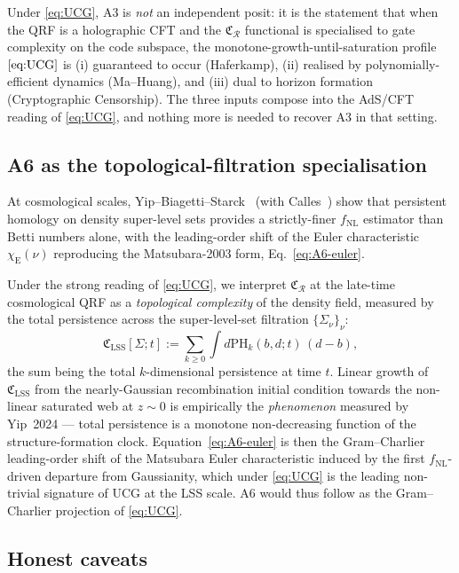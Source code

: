 Under \eqref{eq:UCG}, A3 is \emph{not} an independent posit: it is the
statement that when the QRF is a holographic CFT and the
$\mathfrak{C}_{\mathcal{R}}$ functional is specialised to gate complexity
on the code subspace, the monotone-growth-until-saturation profile
$\eqref{eq:UCG}$ is (i) guaranteed to occur (Haferkamp), (ii) realised by
polynomially-efficient dynamics (Ma--Huang), and (iii) dual to horizon
formation (Cryptographic Censorship). The three inputs compose into the
AdS/CFT reading of \eqref{eq:UCG}, and nothing more is needed to recover
A3 in that setting.

\subsection*{A6 as the topological-filtration specialisation}

At cosmological scales, Yip--Biagetti--Starck~\cite{Yip2024} (with
Calles~\cite{Calles2025}) show that persistent homology on density
super-level sets provides a strictly-finer $f_{\mathrm{NL}}$ estimator
than Betti numbers alone, with the leading-order shift of the Euler
characteristic $\chi_{\mathrm{E}}(\nu)$ reproducing the Matsubara-2003
form, Eq.~\eqref{eq:A6-euler}.

Under the strong reading of \eqref{eq:UCG}, we interpret
$\mathfrak{C}_{\mathcal{R}}$ at the late-time cosmological QRF as a
\emph{topological complexity} of the density field, measured by the
total persistence across the super-level-set filtration
$\{\Sigma_\nu\}_{\nu}$:
\begin{equation}
\mathfrak{C}_{\mathrm{LSS}}[\Sigma;t]
:= \sum_{k\ge 0} \int \!\! d\mathrm{PH}_k(b,d;t) \,(d-b),
\label{eq:C_LSS}
\end{equation}
the sum being the total $k$-dimensional persistence at time $t$. Linear
growth of $\mathfrak{C}_{\mathrm{LSS}}$ from the nearly-Gaussian
recombination initial condition towards the non-linear saturated web at
$z\!\sim\!0$ is empirically the \emph{phenomenon} measured by Yip~2024
--- total persistence is a monotone non-decreasing function of the
structure-formation clock. Equation~\eqref{eq:A6-euler} is then the
Gram--Charlier leading-order shift of the Matsubara Euler characteristic
induced by the first $f_{\mathrm{NL}}$-driven departure from Gaussianity,
which under \eqref{eq:UCG} is the leading non-trivial signature of UCG at
the LSS scale. A6 would thus follow as the Gram--Charlier projection of
\eqref{eq:UCG}.

\subsection*{Honest caveats}

